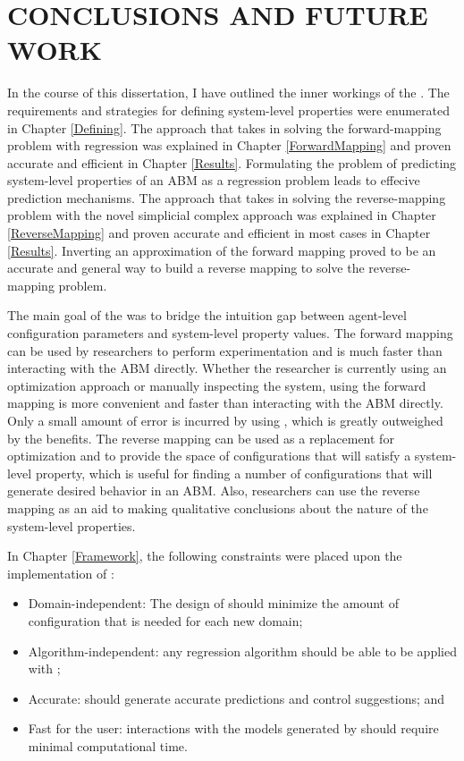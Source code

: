 \chapter{CONCLUSIONS AND FUTURE WORK}
\thispagestyle{plain}

\label{Conclusions}

In the course of this dissertation, I have outlined the inner workings of the \framework.
The requirements and strategies for defining system-level properties were enumerated in Chapter \ref{Defining}.
The approach that \fw takes in solving the forward-mapping problem with regression was explained in Chapter \ref{ForwardMapping} and proven accurate and efficient in Chapter \ref{Results}.
Formulating the problem of predicting system-level properties of an ABM as a regression problem leads to effecive prediction mechanisms.
The approach that \fw takes in solving the reverse-mapping problem with the novel simplicial complex approach was explained in Chapter \ref{ReverseMapping} and proven accurate and efficient in most cases in Chapter \ref{Results}.
Inverting an approximation of the forward mapping proved to be an accurate and general way to build a reverse mapping to solve the reverse-mapping problem.

The main goal of the \framework was to bridge the intuition gap between agent-level configuration parameters and system-level property values.
The forward mapping can be used by researchers to perform experimentation and is much faster than interacting with the ABM directly.
Whether the researcher is currently using an optimization approach or manually inspecting the system, using the forward mapping is  more convenient and faster than interacting with the ABM directly.
Only a small amount of error is incurred by using \fw, which is greatly outweighed by the benefits.
The reverse mapping can be used as a replacement for optimization and to provide the space of configurations that will satisfy a system-level property, which is useful for finding a number of configurations that will generate desired behavior in an ABM.
Also, researchers can use the reverse mapping as an aid to making qualitative conclusions about the nature of the system-level properties.

In Chapter \ref{Framework}, the following constraints were placed upon the implementation of \fw:
\begin{itemize}
      \item Domain-independent: The design of \fw should minimize the amount of configuration that is needed for each new domain;
      \item Algorithm-independent: any regression algorithm should be able to be applied with \fw;
      \item Accurate: \fw should generate accurate predictions and control suggestions; and
      \item Fast for the user: interactions with the models generated by \fw should require minimal computational time.
\end{itemize}

